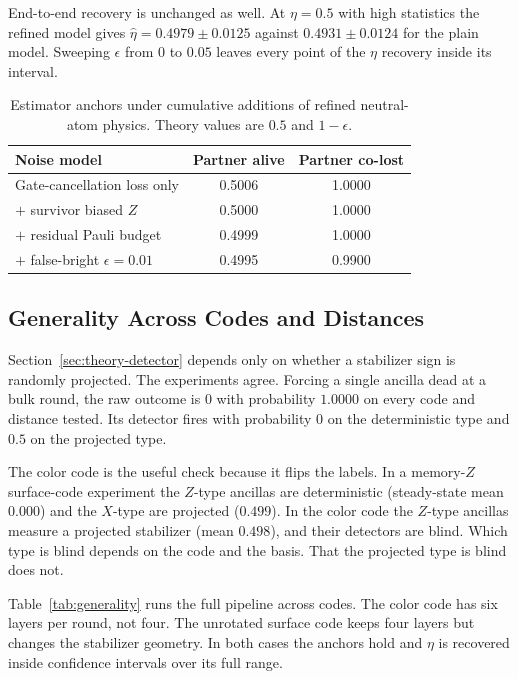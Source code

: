 \documentclass{ieeeaccess}
\begin{document}
End-to-end recovery is unchanged as well. At $\eta=0.5$ with high statistics
the refined model gives $\hat\eta=0.4979\pm 0.0125$ against
$0.4931\pm 0.0124$ for the plain model. Sweeping $\epsilon$ from $0$ to
$0.05$ leaves every point of the $\eta$ recovery inside its interval.

\begin{table}[!t]
\caption{Estimator anchors under cumulative additions of refined neutral-atom
physics. Theory values are $0.5$ and $1-\epsilon$.}
\label{tab:realism}
\centering
\begin{tabular}{@{}lcc@{}}
\toprule
Noise model & Partner alive & Partner co-lost \\
\midrule
Gate-cancellation loss only & 0.5006 & 1.0000 \\
$+$ survivor biased $Z$ & 0.5000 & 1.0000 \\
$+$ residual Pauli budget & 0.4999 & 1.0000 \\
$+$ false-bright $\epsilon=0.01$ & 0.4995 & 0.9900 \\
\bottomrule
\end{tabular}
\end{table}

\subsection{Generality Across Codes and Distances}
\label{sec:res-generality}

Section~\ref{sec:theory-detector} depends only on whether a stabilizer sign is
randomly projected. The experiments agree. Forcing a single ancilla dead at a
bulk round, the raw outcome is $0$ with probability $1.0000$ on every code and
distance tested. Its detector fires with probability $0$ on the deterministic
type and $0.5$ on the projected type.

The color code is the useful check because it flips the labels. In a
memory-$Z$ surface-code experiment the $Z$-type ancillas are deterministic
(steady-state mean $0.000$) and the $X$-type are projected ($0.499$). In the
color code the $Z$-type ancillas measure a projected stabilizer (mean
$0.498$), and their detectors are blind. Which type is blind depends on the
code and the basis. That the projected type is blind does not.

Table~\ref{tab:generality} runs the full pipeline across codes. The color code
has six layers per round, not four. The unrotated surface code keeps four
layers but changes the stabilizer geometry. In both cases the anchors hold
and $\eta$ is recovered inside confidence intervals over its full range.
\end{document}
